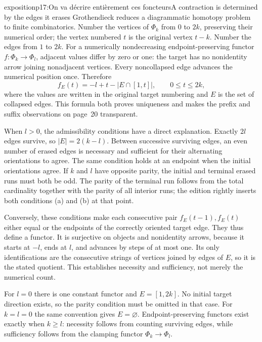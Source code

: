 \begin{dcomment}{exposition}{p17:On va décrire entièrement ces foncteurs}{A contraction is determined by the edges it erases}
Grothendieck reduces a diagrammatic homotopy problem to finite combinatorics. Number the vertices of $\Phi_k$ from $0$ to $2k$, preserving their numerical order; the vertex numbered $t$ is the original vertex $t-k$. Number the edges from $1$ to $2k$. For a numerically nondecreasing endpoint-preserving functor $f:\Phi_k\to\Phi_l$, adjacent values differ by zero or one: the target has no nonidentity arrow joining nonadjacent vertices. Every noncollapsed edge advances the numerical position once. Therefore
\[
 f_E(t)=-l+t-\bigl|E\cap[1,t]\bigr|,
 \qquad 0\leq t\leq2k,
\]
where the values are written in the original target numbering and $E$ is the set of collapsed edges. This formula both proves uniqueness and makes the prefix and suffix observations on page~20 transparent.

When $l>0$, the admissibility conditions have a direct explanation. Exactly $2l$ edges survive, so $|E|=2(k-l)$. Between successive surviving edges, an even number of erased edges is necessary and sufficient for their alternating orientations to agree. The same condition holds at an endpoint when the initial orientations agree. If $k$ and $l$ have opposite parity, the initial and terminal erased runs must both be odd. The parity of the terminal run follows from the total cardinality together with the parity of all interior runs; the edition rightly inserts both conditions (a) and (b) at that point.

Conversely, these conditions make each consecutive pair $f_E(t-1),f_E(t)$ either equal or the endpoints of the correctly oriented target edge. They thus define a functor. It is surjective on objects and nonidentity arrows, because it starts at $-l$, ends at $l$, and advances by steps of at most one. Its only identifications are the consecutive strings of vertices joined by edges of $E$, so it is the stated quotient. This establishes necessity and sufficiency, not merely the numerical count.

For $l=0$ there is one constant functor and $E=[1,2k]$. No initial target direction exists, so the parity condition must be omitted in that case. For $k=l=0$ the same convention gives $E=\varnothing$. Endpoint-preserving functors exist exactly when $k\geq l$: necessity follows from counting surviving edges, while sufficiency follows from the clamping functor $\Phi_k\to\Phi_l$.


\end{dcomment}

